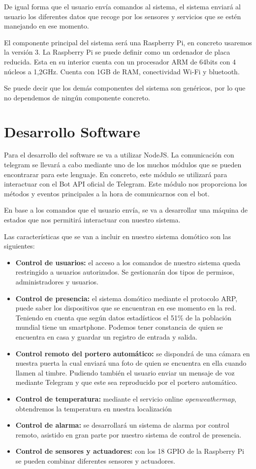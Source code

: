 \documentclass[10pt,journal,compsoc]{IEEEtran}
\begin{document}
De igual forma que el usuario envía comandos al sistema, el sistema enviará al usuario los diferentes 
datos que recoge por los sensores y servicios que se estén manejando en ese momento.

El componente principal del sistema será una Raspberry Pi, en concreto usaremos 
la versión 3. La Raspberry Pi se puede definir como un ordenador de placa 
reducida. Esta en su interior cuenta con un procesador ARM de 64bits con 4 núcleos a 
1,2GHz. Cuenta con 1GB de RAM, conectividad Wi-Fi y bluetooth.

Se puede decir que los demás componentes del sistema son genéricos, por lo que 
no dependemos de ningún componente concreto.

\section{Desarrollo Software}
Para el desarrollo del software se va a utilizar NodeJS. La comunicación con telegram se llevará 
a cabo mediante uno de los muchos módulos que se pueden encontrarar para este lenguaje.
En concreto, este módulo se utilizará para interactuar con el Bot API oficial de Telegram. 
Este módulo nos proporciona los métodos y eventos principales a la hora de comunicarnos con el bot.

En base a los comandos que el usuario envía, se va a desarrollar una máquina de estados que nos 
permitirá interactuar con nuestro sistema.

Las características que se van a incluir en nuestro sistema domótico son las siguientes:
\begin{itemize}
\item \textbf{Control de usuarios:} el acceso a los comandos de nuestro sistema queda restringido a 
usuarios autorizados. Se gestionarán dos tipos de permisos, administradores y usuarios.
\item \textbf{Control de presencia:} el sistema domótico mediante el protocolo ARP, puede saber los 
dispositivos que se encuentran en ese momento en la red. Teniendo en cuenta que según datos 
estadísticos el 51\% de la población mundial tiene un smartphone. Podemos tener constancia de 
quien se encuentra en casa y guardar un registro de entrada y salida.
\item \textbf{Control remoto del portero automático:} se dispondrá de una cámara en nuestra puerta la cual 
enviará una foto de quien se encuentra en ella cuando llamen al timbre. Pudiendo también 
el usuario enviar un mensaje de voz mediante Telegram y que este sea reproducido 
por el portero automático.
\item \textbf{Control de temperatura:} mediante el servicio online \textit{openweathermap}, obtendremos la 
temperatura en nuestra localización
\item \textbf{Control de alarma:} se desarrollará un sistema de alarma por control remoto, asistido en 
gran parte por nuestro sistema de control de presencia.
\item \textbf{Control de sensores y actuadores:} con los 18 GPIO de la Raspberry Pi se pueden combinar 
diferentes sensores y actuadores.
\end{itemize}
\end{document}
